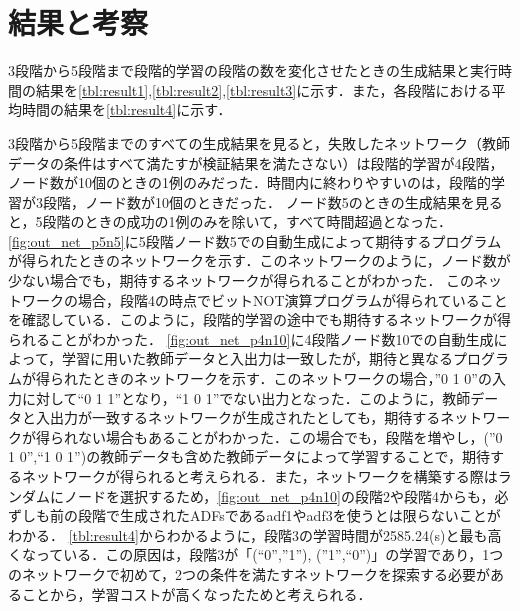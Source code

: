 \documentclass[exploratorypaper]{jsaiart} %
\begin{document}
\section{結果と考察}
3段階から5段階まで段階的学習の段階の数を変化させたときの生成結果と実行時間の結果を\ref{tbl:result1},\ref{tbl:result2},\ref{tbl:result3}に示す．また，各段階における平均時間の結果を\ref{tbl:result4}に示す．

3段階から5段階までのすべての生成結果を見ると，失敗したネットワーク（教師データの条件はすべて満たすが検証結果を満たさない）は段階的学習が4段階，ノード数が10個のときの1例のみだった．時間内に終わりやすいのは，段階的学習が3段階，ノード数が10個のときだった．
ノード数5のときの生成結果を見ると，5段階のときの成功の1例のみを除いて，すべて時間超過となった．\ref{fig:out_net_p5n5}に5段階ノード数5での自動生成によって期待するプログラムが得られたときのネットワークを示す．このネットワークのように，ノード数が少ない場合でも，期待するネットワークが得られることがわかった．
このネットワークの場合，段階4の時点でビットNOT演算プログラムが得られていることを確認している．このように，段階的学習の途中でも期待するネットワークが得られることがわかった．
\ref{fig:out_net_p4n10}に4段階ノード数10での自動生成によって，学習に用いた教師データと入出力は一致したが，期待と異なるプログラムが得られたときのネットワークを示す．このネットワークの場合，”0 1 0”の入力に対して“0 1 1”となり，“1 0 1”でない出力となった．このように，教師データと入出力が一致するネットワークが生成されたとしても，期待するネットワークが得られない場合もあることがわかった．この場合でも，段階を増やし，(”0 1 0”,“1 0 1”)の教師データも含めた教師データによって学習することで，期待するネットワークが得られると考えられる．また，ネットワークを構築する際はランダムにノードを選択するため，\ref{fig:out_net_p4n10}の段階2や段階4からも，必ずしも前の段階で生成されたADFsであるadf1やadf3を使うとは限らないことがわかる．
\ref{tbl:result4}からわかるように，段階3の学習時間が2585.24(s)と最も高くなっている．この原因は，段階3が「(“0”,”1”), (”1”,“0”)」の学習であり，1つのネットワークで初めて，2つの条件を満たすネットワークを探索する必要があることから，学習コストが高くなったためと考えられる．

\end{document}
